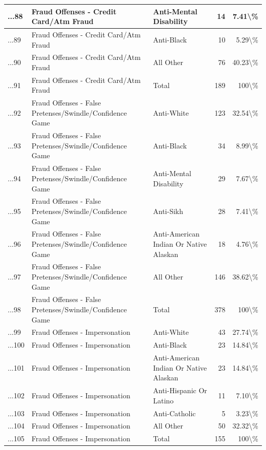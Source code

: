 \documentclass[
]{krantz}
\begin{document}
\begin{longtable}[t]{l|l|l|r|r}
\hline
...88 & Fraud Offenses - Credit Card/Atm Fraud & Anti-Mental Disability & 14 & 7.41\textbackslash{}\%\\
\hline
...89 & Fraud Offenses - Credit Card/Atm Fraud & Anti-Black & 10 & 5.29\textbackslash{}\%\\
\hline
...90 & Fraud Offenses - Credit Card/Atm Fraud & All Other & 76 & 40.23\textbackslash{}\%\\
\hline
...91 & Fraud Offenses - Credit Card/Atm Fraud & Total & 189 & 100\textbackslash{}\%\\
\hline
...92 & Fraud Offenses - False Pretenses/Swindle/Confidence Game & Anti-White & 123 & 32.54\textbackslash{}\%\\
\hline
...93 & Fraud Offenses - False Pretenses/Swindle/Confidence Game & Anti-Black & 34 & 8.99\textbackslash{}\%\\
\hline
...94 & Fraud Offenses - False Pretenses/Swindle/Confidence Game & Anti-Mental Disability & 29 & 7.67\textbackslash{}\%\\
\hline
...95 & Fraud Offenses - False Pretenses/Swindle/Confidence Game & Anti-Sikh & 28 & 7.41\textbackslash{}\%\\
\hline
...96 & Fraud Offenses - False Pretenses/Swindle/Confidence Game & Anti-American Indian Or Native Alaskan & 18 & 4.76\textbackslash{}\%\\
\hline
...97 & Fraud Offenses - False Pretenses/Swindle/Confidence Game & All Other & 146 & 38.62\textbackslash{}\%\\
\hline
...98 & Fraud Offenses - False Pretenses/Swindle/Confidence Game & Total & 378 & 100\textbackslash{}\%\\
\hline
...99 & Fraud Offenses - Impersonation & Anti-White & 43 & 27.74\textbackslash{}\%\\
\hline
...100 & Fraud Offenses - Impersonation & Anti-Black & 23 & 14.84\textbackslash{}\%\\
\hline
...101 & Fraud Offenses - Impersonation & Anti-American Indian Or Native Alaskan & 23 & 14.84\textbackslash{}\%\\
\hline
...102 & Fraud Offenses - Impersonation & Anti-Hispanic Or Latino & 11 & 7.10\textbackslash{}\%\\
\hline
...103 & Fraud Offenses - Impersonation & Anti-Catholic & 5 & 3.23\textbackslash{}\%\\
\hline
...104 & Fraud Offenses - Impersonation & All Other & 50 & 32.32\textbackslash{}\%\\
\hline
...105 & Fraud Offenses - Impersonation & Total & 155 & 100\textbackslash{}\%\\

\end{longtable}
\end{document}
